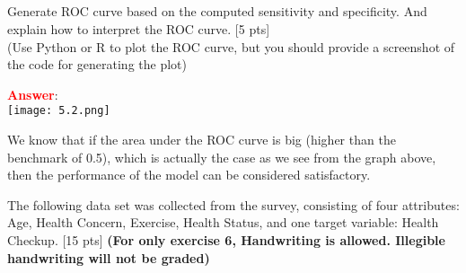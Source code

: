 \documentclass{homework}
\begin{document}
    \newpage
    
    \subsection{}
    Generate ROC curve based on the computed sensitivity and specificity. And explain how to interpret the ROC curve.
    [5 pts] \\
    (Use Python or R to plot the ROC curve, 
    but you should provide a screenshot of the code for generating the plot)
    
    \textbf{\textcolor{red}{Answer}}:\\
    
     \texttt{[image: 5.2.png]}
     
     We know that if the area under the ROC curve is big (higher than the benchmark of 0.5), which is actually the case as we see from the graph above, then the performance of the model can be considered satisfactory.
    
    
    \newpage    
    
    \exercise*
    The following data set was collected from the survey, consisting of four attributes: Age, Health Concern, Exercise, Health Status, and one target variable: Health Checkup. [15 pts]
    \textbf{(For only exercise 6, Handwriting is allowed. Illegible handwriting will not be graded)}
    
\end{document}
